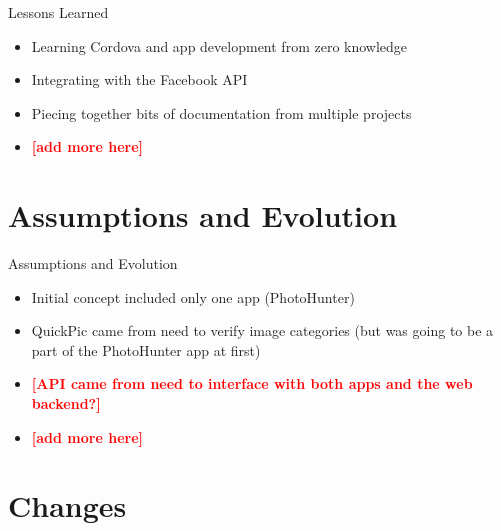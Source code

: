 \documentclass[aspectratio=169]{beamer}
\newcommand{\todo}[1]{\textcolor{red}{\textbf{[#1]}}}
\begin{document}
\begin{frame}{Lessons Learned}
	\begin{itemize}

		\item Learning Cordova and app development from zero knowledge

		\item Integrating with the Facebook API

		\item Piecing together bits of documentation from multiple projects

		\item \todo{add more here}

	\end{itemize}
\end{frame}

\section{Assumptions and Evolution}

\begin{frame}{Assumptions and Evolution}
	\begin{itemize}

		\item Initial concept included only one app (PhotoHunter)

		\item QuickPic came from need to verify image categories (but was going to
					be a part of the PhotoHunter app at first)

		\item \todo{API came from need to interface with both apps and the web backend?}

		\item \todo{add more here}

	\end{itemize}
\end{frame}

\section{Changes}
\end{document}
